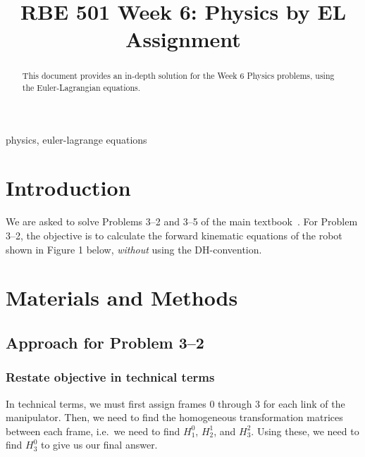 \documentclass[conference]{IEEEtran}
\begin{document}
\title{RBE 501 Week 6: Physics by EL Assignment}

\author{
}

\maketitle

\begin{abstract}
This document provides an in-depth solution for the Week 6 Physics problems, using
the Euler-Lagrangian equations.
\end{abstract}

\begin{IEEEkeywords}
physics, euler-lagrange equations
\end{IEEEkeywords}

\section{Introduction}
We are asked to solve Problems 3--2 and 3--5 of the main textbook~\cite{Spong2006}.
For Problem 3--2, the objective is to calculate the forward kinematic equations
of the robot shown in Figure 1 below, \textit{without} using the DH-convention.\\

\section{Materials and Methods}

\subsection{Approach for Problem 3--2}

\subsubsection{Restate objective in technical terms}
In technical terms, we must first assign frames 0 through 3 for
each link of the manipulator. Then, we need to find the homogeneous
transformation matrices between each frame, i.e.\ we need to find
$H^0_1$, $H^1_2$, and $H^2_3$. Using these, we need to find $H^0_3$
to give us our final answer.
\end{document}
